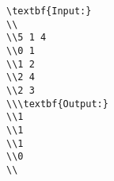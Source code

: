 \begin{verbatim}
\textbf{Input:}
\\
\\5 1 4
\\0 1
\\1 2
\\2 4
\\2 3
\\\textbf{Output:}
\\1
\\1
\\1
\\0
\\\end{verbatim}